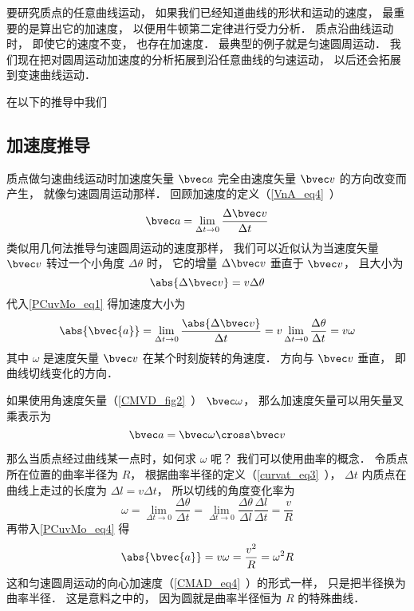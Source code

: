 

要研究质点的任意曲线运动， 如果我们已经知道曲线的形状和运动的速度， 最重要的是算出它的加速度， 以便用牛顿第二定律进行受力分析． 质点沿曲线运动时， 即使它的速度不变， 也存在加速度． 最典型的例子就是匀速圆周运动． 我们现在把对圆周运动加速度的分析拓展到沿任意曲线的匀速运动， 以后还会拓展到变速曲线运动．

在以下的推导中我们

\subsection{加速度推导}

质点做匀速曲线运动时加速度矢量 $\bvec a$ 完全由速度矢量 $\bvec v$ 的方向改变而产生， 就像匀速圆周运动那样． 回顾加速度的定义（\autoref{VnA_eq4}~）
\begin{equation}\label{PCuvMo_eq2}
\bvec a = \lim_{\Delta t \to 0} \frac{\Delta \bvec v}{\Delta t}
\end{equation}
类似用几何法推导匀速圆周运动的速度那样， 我们可以近似认为当速度矢量 $\bvec v$ 转过一个小角度 $\Delta \theta$ 时， 它的增量 $\Delta \bvec v$ 垂直于 $\bvec v$， 且大小为
\begin{equation}\label{PCuvMo_eq1}
\abs{\Delta \bvec v} = v\Delta\theta
\end{equation}
代入\autoref{PCuvMo_eq1} 得加速度大小为
\begin{equation}\label{PCuvMo_eq4}
\abs{\bvec{a}} = \lim_{\Delta t \to 0} \frac{\abs{\Delta \bvec v}}{\Delta t}
= v\lim_{\Delta t \to 0}\frac{\Delta \theta}{\Delta t} = v\omega
\end{equation}
其中 $\omega$ 是速度矢量 $\bvec v$ 在某个时刻旋转的角速度． 方向与 $\bvec v$ 垂直， 即曲线切线变化的方向．

如果使用角速度矢量（\autoref{CMVD_fig2}~） $\bvec \omega$， 那么加速度矢量可以用矢量叉乘表示为
\begin{equation}
\bvec a = \bvec \omega \cross \bvec v
\end{equation}

那么当质点经过曲线某一点时，如何求 $\omega$ 呢？ 我们可以使用曲率的概念． 令质点所在位置的曲率半径为 $R$， 根据曲率半径的定义（\autoref{curvat_eq3}~）， $\Delta t$ 内质点在曲线上走过的长度为 $\Delta l = v \Delta t$， 所以切线的角度变化率为
\begin{equation}
\omega = \lim_{\Delta t\to 0}\frac{\Delta \theta}{\Delta t} = \lim_{\Delta t\to 0}\frac{\Delta \theta}{\Delta l} \frac{\Delta l}{\Delta t} = \frac{v}{R}
\end{equation}
再带入\autoref{PCuvMo_eq4} 得
\begin{equation}\label{PCuvMo_eq3}
\abs{\bvec{a}} = v\omega = \frac{v^2}{R} = \omega^2 R
\end{equation}
这和匀速圆周运动的向心加速度（\autoref{CMAD_eq4}~）的形式一样， 只是把半径换为曲率半径． 这是意料之中的， 因为圆就是曲率半径恒为 $R$ 的特殊曲线．
